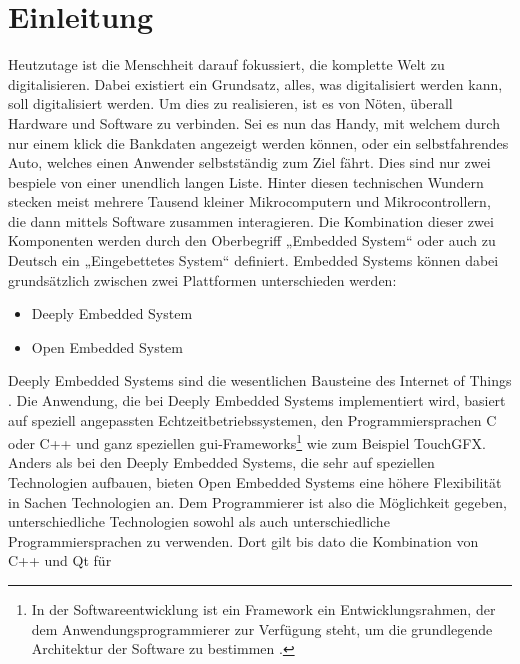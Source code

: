 \chapter{Einleitung}
\label{chap:einleitung}
Heutzutage ist die Menschheit darauf fokussiert, die komplette Welt zu digitalisieren. Dabei
existiert ein Grundsatz, alles, was digitalisiert werden kann, soll digitalisiert werden. Um dies
zu realisieren, ist es von Nöten, überall Hardware und Software zu verbinden. Sei es nun das
Handy, mit welchem durch nur einem klick die Bankdaten angezeigt werden können, oder ein
selbstfahrendes Auto, welches einen Anwender selbstständig zum Ziel fährt. Dies sind nur zwei
bespiele von einer unendlich langen Liste. Hinter diesen technischen Wundern stecken meist
mehrere Tausend kleiner Mikrocomputern und Mikrocontrollern, die dann mittels Software zusammen
interagieren. Die Kombination dieser zwei Komponenten werden durch den Oberbegriff „Embedded
System“ oder auch zu Deutsch ein „Eingebettetes System“ definiert.
\newline
\newline
Embedded Systems können dabei grundsätzlich zwischen zwei Plattformen unterschieden werden:
\begin{itemize}
    \item Deeply Embedded System
    \item Open Embedded System
\end{itemize}
\newline
\newline
Deeply Embedded Systems sind die wesentlichen Bausteine des Internet of Things
\cite{HochschuleniederrheimDeeply}. Die Anwendung,
die bei Deeply Embedded Systems implementiert wird, basiert auf speziell angepassten
Echtzeitbetriebssystemen, den Programmiersprachen C oder C++ und ganz speziellen
\ac{gui}-Frameworks\footnote{In der Softwareentwicklung ist ein Framework ein Entwicklungsrahmen,
    der dem Anwendungsprogrammierer zur Verfügung steht, um die grundlegende Architektur der
    Software zu bestimmen \cite{WasIstEinFramework}.} wie zum Beispiel TouchGFX.
\newline
\newline
Anders als bei den Deeply Embedded Systems, die sehr auf speziellen Technologien aufbauen, bieten
Open Embedded Systems eine höhere Flexibilität in Sachen Technologien an. Dem Programmierer ist
also die Möglichkeit gegeben, unterschiedliche Technologien sowohl als auch unterschiedliche
Programmiersprachen zu verwenden. Dort gilt bis dato die Kombination von C++ und Qt für
